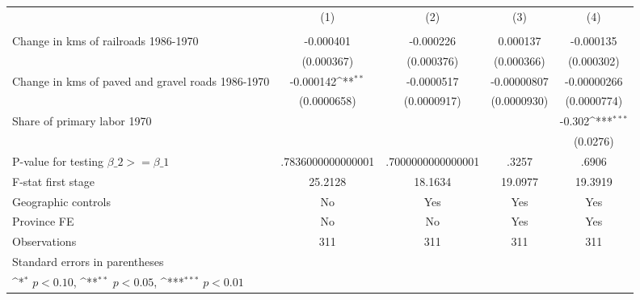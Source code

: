 {
\def\sym#1{\ifmmode^{#1}\else\(^{#1}\)\fi}
\begin{tabular}{l*{4}{c}}
\hline\hline
                &\multicolumn{1}{c}{(1)}&\multicolumn{1}{c}{(2)}&\multicolumn{1}{c}{(3)}&\multicolumn{1}{c}{(4)}\\
                &\multicolumn{1}{c}{}&\multicolumn{1}{c}{}&\multicolumn{1}{c}{}&\multicolumn{1}{c}{}\\
\hline
Change in kms of railroads 1986-1970&-0.000401         &-0.000226         & 0.000137         &-0.000135         \\
                &(0.000367)         &(0.000376)         &(0.000366)         &(0.000302)         \\
[1em]
Change in kms of paved and gravel roads 1986-1970&-0.000142\sym{**} &-0.0000517         &-0.00000807         &-0.00000266         \\
                &(0.0000658)         &(0.0000917)         &(0.0000930)         &(0.0000774)         \\
[1em]
Share of primary labor 1970&                  &                  &                  &   -0.302\sym{***}\\
                &                  &                  &                  & (0.0276)         \\
\hline
P-value for testing $\beta\_{2} >= \beta\_{1}$&.7836000000000001         &.7000000000000001         &    .3257         &    .6906         \\
F-stat first stage&  25.2128         &  18.1634         &  19.0977         &  19.3919         \\
Geographic controls&       No         &      Yes         &      Yes         &      Yes         \\
Province FE     &       No         &       No         &      Yes         &      Yes         \\
Observations    &      311         &      311         &      311         &      311         \\
\hline\hline
\multicolumn{5}{l}{\footnotesize Standard errors in parentheses}\\
\multicolumn{5}{l}{\footnotesize \sym{*} \(p<0.10\), \sym{**} \(p<0.05\), \sym{***} \(p<0.01\)}\\
\end{tabular}
}
